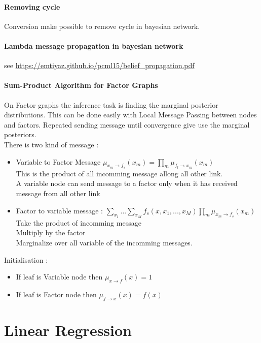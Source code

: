 			\paragraph*{Removing cycle}
				Conversion make possible to remove cycle in bayesian network.

			\paragraph*{Lambda message propagation in bayesian network}
				see \url{https://emtiyaz.github.io/pcml15/belief_propagation.pdf}

			\paragraph*{Sum-Product Algorithm for Factor Graphs}

				On Factor graphs the inference task is finding the marginal posterior distributions. This can be done easily with Local Message Passing between nodes and factors. Repeated sending message until convergence give use the marginal posteriors. \\
				There is two kind of message : 
				\begin{itemize}
					\item Variable to Factor Message $\mu_{x_m \rightarrow f_s}(x_m)=\prod_m \mu_{f_l \rightarrow x_m}(x_m)$\\
					This is the product of all incomming message allong all other link. \\
					A variable node can send message to a factor only when it has received message from all other link
					\item Factor to variable message : $\sum_{x_1}...\sum_{x_M} f_s (x, x_1, ... , x_M) \prod_m \mu_{x_m \rightarrow f_s}(x_m)$\\
					Take the product of incomming message\\
					Multiply by the factor\\
					Marginalize over all variable of the incomming messages.
				\end{itemize}
				Initialisation : 
				\begin{itemize}
					\item If leaf is Variable node then $\mu_{x \rightarrow f}(x) = 1$
					\item If leaf is Factor node then $\mu_{f \rightarrow x}(x)= f(x)$
				\end{itemize}
\section{Linear Regression}

